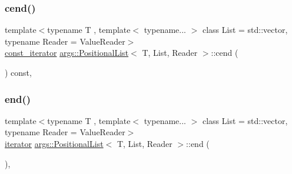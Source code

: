 \mbox{\label{classargs_1_1_positional_list_a6655c6571a708a936c0b4483dab4210e}} 
\subsubsection{\texorpdfstring{cend()}{cend()}}
{\footnotesize\ttfamily template$<$typename T , template$<$ typename... $>$ class List = std\+::vector, typename Reader  = Value\+Reader$>$ \\
\hyperlink{classargs_1_1_positional_list_a5675a3e27a2a7fc6a7fbd933bd13f3cf}{const\+\_\+iterator} \hyperlink{classargs_1_1_positional_list}{args\+::\+Positional\+List}$<$ T, List, Reader $>$\+::cend (\begin{DoxyParamCaption}{ }\end{DoxyParamCaption}) const\hspace{0.3cm}{\ttfamily [inline]}, {\ttfamily [noexcept]}}

\mbox{\label{classargs_1_1_positional_list_a5b139259c93d9fd2a315398533fab1b3}} 
\subsubsection{\texorpdfstring{end()}{end()}\hspace{0.1cm}{\footnotesize\ttfamily [1/2]}}
{\footnotesize\ttfamily template$<$typename T , template$<$ typename... $>$ class List = std\+::vector, typename Reader  = Value\+Reader$>$ \\
\hyperlink{classargs_1_1_positional_list_ad0833c77245d7bc7678de4896d8443da}{iterator} \hyperlink{classargs_1_1_positional_list}{args\+::\+Positional\+List}$<$ T, List, Reader $>$\+::end (\begin{DoxyParamCaption}{ }\end{DoxyParamCaption})\hspace{0.3cm}{\ttfamily [inline]}, {\ttfamily [noexcept]}}

\mbox{\label{classargs_1_1_positional_list_ad35ce0d9da38076ab89726c9e45718c8}} 
